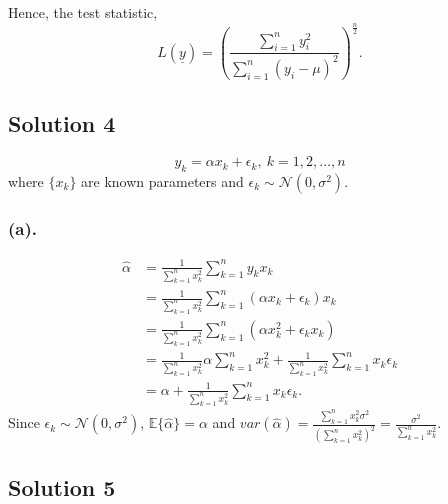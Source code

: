 \documentclass[a4paper,english,12pt]{article}
\begin{document}
Hence, the test statistic,
\begin{equation*}
L(\underline{y})=\left(\frac{\sum \limits_{i=1}^n y_i^2}{\sum \limits_{i=1}^n (y_i - \mu)^2}\right)^{\frac{n}{2}}.
\end{equation*}
\hypertarget{solution4}{\subsection*{Solution 4}}
\begin{equation*}
y_k=\alpha x_k+\epsilon_k, \ k = 1,2,\dots,n
\end{equation*}
where $\{x_k\}$ are known parameters and $\epsilon_k \sim \mathcal{N}(0,\sigma^2)$.
\subsubsection*{(a).}
\begin{align*}
\hat{\alpha }&=\frac{1}{\sum\limits_{k=1}^{n}x_{k}^2}\sum\limits_{k=1}^{n}y_{k}x_{k}\\
  &=\frac{1}{\sum\limits_{k=1}^{n}x_{k}^2}\sum\limits_{k=1}^{n}(\alpha x_{k}+\epsilon_{k})x_{k}\\
  &=\frac{1}{\sum\limits_{k=1}^{n}x_{k}^2}\sum\limits_{k=1}^{n}(\alpha x_{k}^2+\epsilon_{k} x_{k})\\
  &=\frac{1}{\sum\limits_{k=1}^{n} x_{k}^2}\alpha\sum_{k=1}^nx_k^2+\frac{1}{\sum\limits_{k=1}^{n} x_{k}^2}\sum_{k=1}^n x_k\epsilon_k\\
  &=\alpha+\frac{1}{\sum\limits_{k=1}^{n} x_{k}^2}\sum_{k=1}^n x_k\epsilon_k.
\end{align*}
Since $\epsilon_k \sim \mathcal{N}(0,\sigma^2)$, $\mathbb{E}\{\hat{\alpha}\}=\alpha$ and $var(\hat{\alpha})=\frac{\sum_{k=1}^nx_k^2\sigma^2}{\left(\sum_{k=1}^nx_k^2\right)^2}=\frac{\sigma^2}{\sum_{k=1}^nx_k^2}$.
\hypertarget{solution5}{\subsection*{Solution 5}}
\end{document}
